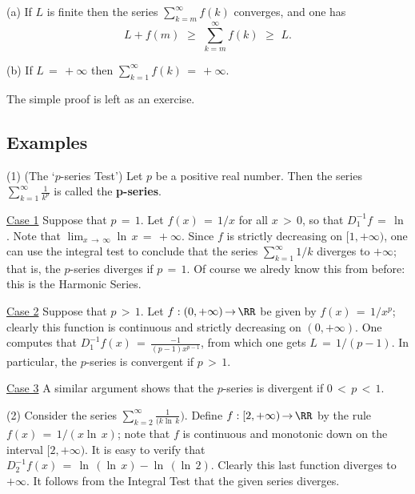         (a) If $L$ is finite then the series $\sum_{k=m}^{{\infty}} f(k)$ converges, and one has
        \begin{displaymath}
        L + f(m)\,\,{\geq}\,\,\sum_{k=m}^{{\infty}} f(k)\,\,{\geq}\,\,L.
        \end{displaymath}

\V

        (b) If $L \,=\, +{\infty}$ then $\sum_{k=1}^{{\infty}} f(k) \,=\, +{\infty}$.

\V

        The simple proof is left as an exercise.

\V

        \subsection{\small{{\bf Examples}}}
        \label{ExampG50.110}
 
\V

\hspace*{\parindent}(1) (The `$p$-series Test') Let $p$ be a positive real number.
    Then the series ${\displaystyle \sum_{k=1}^{{\infty}} \frac{1}{k^{p}}}$ is called the {\bf p-series}.

        \underline{Case 1} Suppose that $p \,=\, 1$. Let $f(x) \,=\,1/x$ for all $x\,>\,0$, so that $D^{-1}_{1} f \,=\, {\ln}$.
    Note that $\lim_{x \,{\rightarrow}\, {\infty}} {\ln}\,x \,=\, +{\infty}$.
    Since $f$ is strictly decreasing on $[1,+{\infty})$, one can use the integral test to conclude that the series $\sum_{k=1}^{{\infty}} 1/k$ diverges to $+{\infty}$; that is, the $p$-series diverges if $p \,=\, 1$.
    Of course we alredy know this from before: this is the Harmonic Series.

\V

        \underline{Case 2} Suppose that $p\,>\,1$. Let $f:(0,+{\infty}) \,{\rightarrow}\, {\RR}$ be given by $f(x) \,=\, 1/x^{p}$; clearly this function is continuous and strictly decreasing on $(0,+{\infty})$.
    One computes that ${\displaystyle D^{-1}_{1}f(x) \,=\, \frac{-1}{(p-1)x^{p-1}}}$, from which one gets $L \,=\, 1/(p-1)$.
    In particular, the $p$-series is convergent if $p\,>\,1$.

\V

        \underline{Case 3} A similar argument shows that the $p$-series is divergent if $0\,<\,p\,<\,1$.

\V
\V

        (2) Consider the series ${\displaystyle \sum_{k=2}^{{\infty}} \frac{1}{(k{\ln}\,k})}$.
    Define $f:[2,+{\infty}) \,{\rightarrow}\, {\RR}$ by the rule $f(x) \,=\, 1/(x{\ln}\,x)$;
    note that $f$ is continuous and monotonic down on the interval $[2,+{\infty})$.
    It is easy to verify that $D^{-1}_{2}f(x) \,=\, {\ln}\,({\ln}\,x) - {\ln}\,({\ln}\,2)$.
    Clearly this last function diverges to $+{\infty}$. It follows from the Integral Test that the given series diverges.

